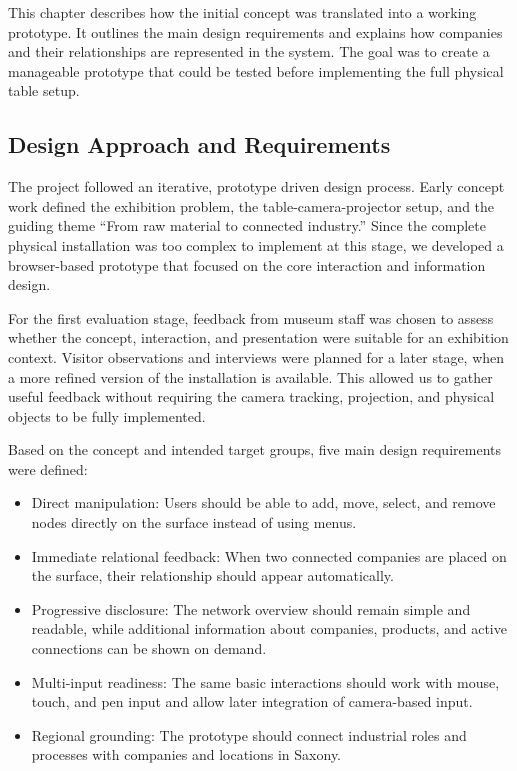 \documentclass[sigconf,nonacm]{acmart}
\begin{document}
This chapter describes how the initial concept was translated into a working prototype. It outlines the main design requirements and explains how companies and their relationships are represented in the system. The goal was to create a manageable prototype that could be tested before implementing the full physical table setup.

\subsection{Design Approach and Requirements}

The project followed an iterative, prototype driven design process. Early concept work defined the exhibition problem, the table-camera-projector setup, and the guiding theme ``From raw material to connected industry.'' Since the complete physical installation was too complex to implement at this stage, we developed a browser-based prototype that focused on the core interaction and information design.

For the first evaluation stage, feedback from museum staff was chosen to assess whether the concept, interaction, and presentation were suitable for an exhibition context. Visitor observations and interviews were planned for a later stage, when a more refined version of the installation is available. This allowed us to gather useful feedback without requiring the camera tracking, projection, and physical objects to be fully implemented.

Based on the concept and intended target groups, five main design requirements were defined:

\begin{itemize}
  \item Direct manipulation: Users should be able to add, move, select, and remove nodes directly on the surface instead of using menus.
  \item Immediate relational feedback: When two connected companies are placed on the surface, their relationship should appear automatically.
  \item Progressive disclosure: The network overview should remain simple and readable, while additional information about companies, products, and active connections can be shown on demand.
  \item Multi-input readiness: The same basic interactions should work with mouse, touch, and pen input and allow later integration of camera-based input.
  \item Regional grounding: The prototype should connect industrial roles and processes with companies and locations in Saxony.
\end{itemize}
\end{document}
